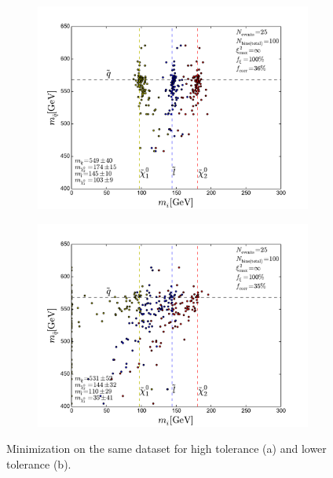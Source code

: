 \documentclass[twoside,english]{uiofysmaster}
\begin{document}
\begin{figure}[hbt]
	\centering
	\begin{subfigure}[b]{0.6\textwidth}
		\includegraphics[width=\textwidth]{figures/webber_rec_table/high-tol.pdf} 
		\caption{ }
	\end{subfigure}

	\begin{subfigure}[b]{0.6\textwidth}
		\includegraphics[width=\textwidth]{figures/webber_rec_table/low-tol.pdf}
		\caption{ } 
	\end{subfigure}
	\caption{Minimization on the same dataset for high tolerance (a) and lower tolerance (b).}
	\label{fig:webber_rec_scatter_tolerance-comparison}
\end{figure}
\end{document}
